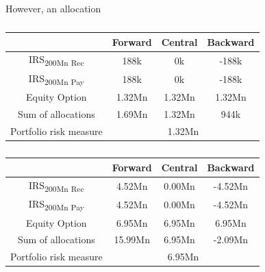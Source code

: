 \documentclass[../Thesis_AHoecherl.tex]{subfiles}
\begin{document}
    However, an allocation 

    \begin{table}[htbp]
        \label{tab:EAD perfect hedge}
        \centering
            \begin{tabular}{c|c|c|c}
                & Forward & Central & Backward \\
                \toprule
                IRS\textsubscript{200Mn Rec} & 188k & 0k & -188k \\
                \midrule
                IRS\textsubscript{200Mn Pay} & 188k & 0k & -188k\\
                \midrule
                Equity Option & 1.32Mn & 1.32Mn & 1.32Mn\\
                \bottomrule
                Sum of allocations & 1.69Mn & 1.32Mn & 944k \\
                \midrule
                Portfolio risk measure & \multicolumn{3}{c}{1.32Mn} \\
            \end{tabular}%
        \caption{}
    \end{table}

    \begin{table}[htbp]
        \label{tab:IM perfect hedge}
        \centering
            \begin{tabular}{c|c|c|c}
                & Forward & Central & Backward \\
                \toprule
                IRS\textsubscript{200Mn Rec} & 4.52Mn & 0.00Mn & -4.52Mn \\
                \midrule
                IRS\textsubscript{200Mn Pay} & 4.52Mn & 0.00Mn & -4.52Mn \\
                \midrule
                Equity Option & 6.95Mn & 6.95Mn & 6.95Mn \\
                \bottomrule
                Sum of allocations & 15.99Mn & 6.95Mn & -2.09Mn \\
                \midrule
                Portfolio risk measure & \multicolumn{3}{c}{6.95Mn}  \\
            \end{tabular}%
        \caption{}
    \end{table}
\end{document}
